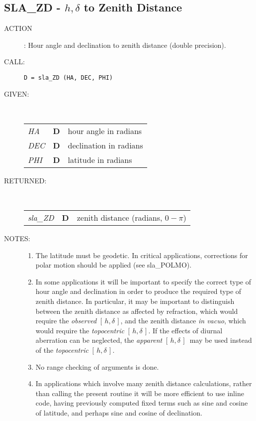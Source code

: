 \documentclass[11pt,twoside]{article}
\newcommand{\xlabel}[1]{}
\newcommand{\hadec}     {$[\,h,\delta\,]$}
\newcommand{\routine}[3]
{\hbadness=10000
  \vbox
  {
    \rule{\textwidth}{0.3mm}\\
    {\Large {\bf #1} \hfill #2 \hfill {\bf #1}}\\
    \setlength{\oldspacing}{\topsep}
    \setlength{\topsep}{0.3ex}
    \begin{description}
      #3
    \end{description}
    \setlength{\topsep}{\oldspacing}
  }
}
\renewcommand{\routine}[3]
   {
      \subsection{#1\xlabel{#1} - #2\label{#1}}
       \begin{description}
         #3
       \end{description}
   }
\newcommand{\action}[1]
{\item[ACTION]: #1}
\newcommand{\action}[1]
   {\item[ACTION:] #1}
\newcommand{\call}[1]
{\item[CALL]: \hspace{0.4em}{\tt #1}}
\newlength{\oldspacing}
\renewcommand{\call}[1]
   {
    \item[CALL:] {\tt #1}
   }
\newcommand{\args}[2]
{
  \goodbreak
  \setlength{\oldspacing}{\topsep}
  \setlength{\topsep}{0.3ex}
  \begin{description}
  \item[#1]:\\[1.5ex]
    \begin{tabular}{p{7em}p{6em}p{22em}}
      #2
    \end{tabular}
  \end{description}
  \setlength{\topsep}{\oldspacing}
}
\renewcommand{\args}[2]
   {
     \begin{description}
        \item[#1:]\\
        \begin{tabular}{p{7em}p{6em}l}
           #2
        \end{tabular}
     \end{description}
   }
\newcommand{\spec}[3]
{
  {\em {#1}} & {\bf \mbox{#2}} & {#3}
}
\newcommand{\notes}[1]
{
  \goodbreak
  \setlength{\oldspacing}{\topsep}
  \setlength{\topsep}{0.3ex}
  \begin{description}
    \item[NOTES]:
        #1
  \end{description}
  \setlength{\topsep}{\oldspacing}
}
\renewcommand{\notes}[1]
   {
      \begin{description}
         \item[NOTES:]
            #1
      \end{description}
   }
\begin{document}
\routine{SLA\_ZD}{$h,\delta$ to Zenith Distance}
{
 \action{Hour angle and declination to zenith distance
         (double precision).}
 \call{D~=~sla\_ZD (HA, DEC, PHI)}
}
\args{GIVEN}
{
 \spec{HA}{D}{hour angle in radians} \\
 \spec{DEC}{D}{declination in radians} \\
 \spec{PHI}{D}{latitude in radians}
}
\args{RETURNED}
{
 \spec{sla\_ZD}{D}{zenith distance (radians, $0\!-\!\pi$)}
}
\notes
{
 \begin{enumerate}
  \item The latitude must be geodetic.  In critical applications,
        corrections for polar motion should be applied (see sla\_POLMO).
  \item In some applications it will be important to specify the
        correct type of hour angle and declination in order to
        produce the required type
        of zenith distance.  In particular, it may be
        important to distinguish between the zenith distance
        as affected by refraction, which would require the
        {\it observed}\/ \hadec, and the zenith distance {\it in vacuo},
        which would require the {\it topocentric}\/ \hadec.  If
        the effects of diurnal aberration can be neglected, the
        {\it apparent}\/ \hadec\ may be used instead of the
        {\it topocentric}\/ \hadec.
  \item No range checking of arguments is done.
  \item In applications which involve many zenith distance calculations,
        rather than calling the present routine it will be more
        efficient to use inline code, having previously computed fixed
        terms such as sine and cosine of latitude, and perhaps sine and
        cosine of declination.
 \end{enumerate}
}

\pagebreak
\end{document}
